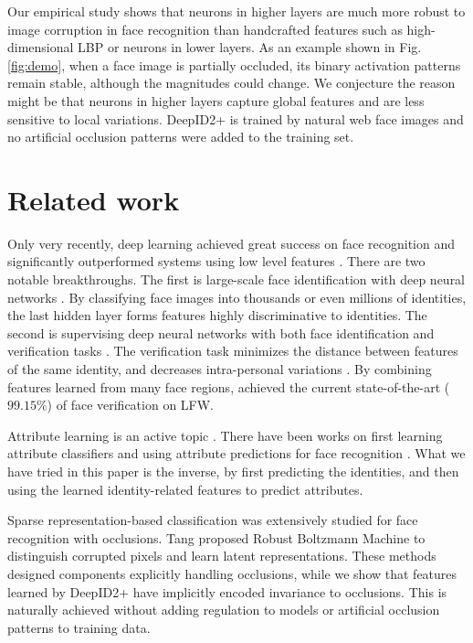 \documentclass[10pt,twocolumn,letterpaper]{article}
\begin{document}
Our empirical study shows that neurons in higher layers are much more robust to image corruption in face recognition than handcrafted features such as high-dimensional LBP or neurons in lower layers. As an example shown in Fig. \ref{fig:demo}, when a face image is partially occluded, its binary activation patterns remain stable, although the magnitudes could change. We conjecture the reason might be that neurons in higher layers capture global features and are less sensitive to local variations. DeepID2+ is trained by natural web face images and no artificial occlusion patterns were added to the training set.


\section{Related work}

Only very recently, deep learning  achieved great success on face recognition \cite{zhu2013,taigman2014a,sun2014a,sun2014b,taigman2014b} and significantly outperformed systems using low level features \cite{kumar2009,taigman2009,guillaumin2009,yin2011,huang2011,chen2012,berg2012,simonyan2013,chen2013,cao2013}. There are two notable breakthroughs. The first is large-scale face identification with deep neural networks \cite{taigman2014a,sun2014a,taigman2014b}. By classifying face images into thousands or even millions of identities, the last hidden layer  forms features highly discriminative to identities. The second is supervising deep neural networks with both face identification and verification tasks \cite{sun2014b}. The verification task minimizes the distance between features of the same identity, and decreases  intra-personal variations \cite{sun2014b}. By combining features learned  from many face regions, \cite{sun2014b} achieved the current state-of-the-art ($99.15\%$) of face verification on LFW.

Attribute learning  is  an active  topic \cite{farhadi2009,berg2010,parikh2011,bourdev2011,luo2013,zhang2014}. There have been works on first learning attribute classifiers and using attribute predictions for face recognition \cite{kumar2009,chung2012}. What we have tried in this paper is the inverse, by first predicting the identities, and then using the learned identity-related features to predict attributes.

Sparse representation-based classification \cite{wright2009, yang2010,liu2010,zhang2011a,elhamifar2011,jia2012} was extensively studied for face recognition with occlusions. Tang \etal \cite{tang2012} proposed Robust Boltzmann Machine to distinguish corrupted pixels and learn latent representations. These  methods designed components explicitly handling occlusions, while we show that features learned by DeepID2+ have implicitly encoded  invariance to occlusions. This is naturally achieved without adding regulation to  models or artificial occlusion patterns to  training data.
\end{document}
